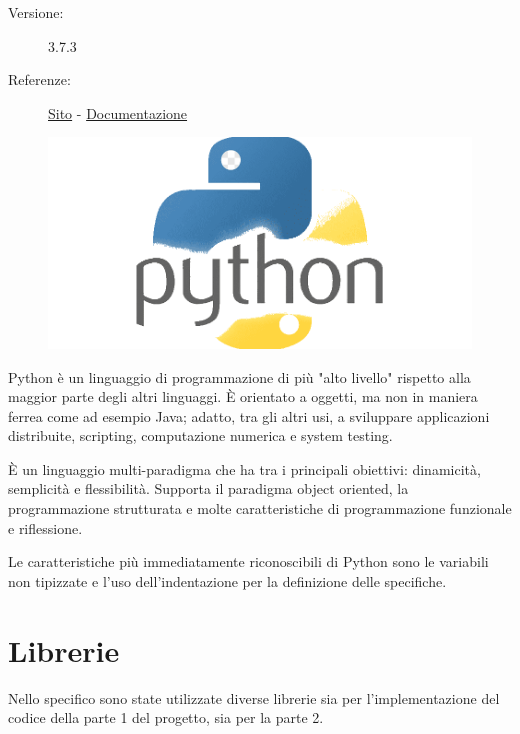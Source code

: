 \documentclass[preprint,12pt]{elsarticle}
\begin{document}
	\medskip
	\begin{description}
		\item[Versione:] 3.7.3
		\item[Referenze:] \href{https://www.python.org}{Sito} - \href{https://docs.python.org/3/}{Documentazione}
	\end{description}
	
	\begin{figure}[H]
		\centering
		\includegraphics[width=.3\linewidth]{logo}
	\end{figure}
	
	Python è un linguaggio di programmazione di più "alto livello" rispetto alla maggior parte degli altri linguaggi. È orientato a oggetti, ma non in maniera ferrea come ad esempio Java; adatto, tra gli altri usi, a sviluppare applicazioni distribuite, scripting, computazione numerica e system testing.
	
	È un linguaggio multi-paradigma che ha tra i principali obiettivi: dinamicità, semplicità e flessibilità. Supporta il paradigma object oriented, la programmazione strutturata e molte caratteristiche di programmazione funzionale e riflessione.
	
	Le caratteristiche più immediatamente riconoscibili di Python sono le variabili non tipizzate e l'uso dell'indentazione per la definizione delle specifiche. \\
	
	\section{Librerie}
	Nello specifico sono state utilizzate diverse librerie sia per l'implementazione del codice della parte 1 del progetto, sia per la parte 2.
	
\end{document}
